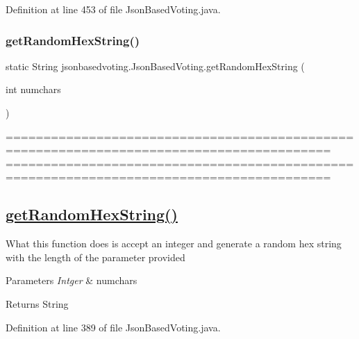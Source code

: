 Definition at line 453 of file Json\+Based\+Voting.\+java.

\mbox{\label{classjsonbasedvoting_1_1_json_based_voting_a1bce9a2d9ca3518b754e4f4506826b7b}} 
\subsubsection{\texorpdfstring{getRandomHexString()}{getRandomHexString()}}
{\footnotesize\ttfamily static String jsonbasedvoting.\+Json\+Based\+Voting.\+get\+Random\+Hex\+String (\begin{DoxyParamCaption}\item[{int}]{numchars }\end{DoxyParamCaption})\hspace{0.3cm}{\ttfamily [static]}}

========================================================================================= ========================================================================================= \subsection*{\mbox{\hyperlink{classjsonbasedvoting_1_1_json_based_voting_a1bce9a2d9ca3518b754e4f4506826b7b}{get\+Random\+Hex\+String()}} }

What this function does is accept an integer and generate a random hex string with the length of the parameter provided 
\begin{DoxyParams}{Parameters}
{\em Intger} & numchars \\
\hline
\end{DoxyParams}
\begin{DoxyReturn}{Returns}
String 
\end{DoxyReturn}


Definition at line 389 of file Json\+Based\+Voting.\+java.

\mbox{\label{classjsonbasedvoting_1_1_json_based_voting_a680b57ed482d3bb4b0427d7219712823}} 
